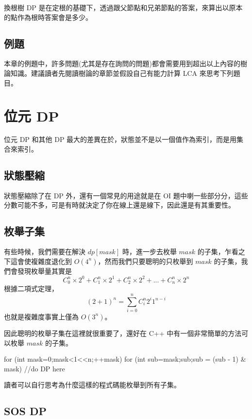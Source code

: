 \documentclass[main.tex]{subfiles}
\begin{document}
        換根樹 DP 是在定根的基礎下，透過跟父節點和兄弟節點的答案，來算出以原本的點作為根時答案會是多少。
    
    \subsection{例題}
        本章的例題中，許多問題(尤其是存在詢問的問題)都會需要用到超出以上內容的樹論知識。建議讀者先閱讀樹論的章節並假設自己有能力計算 LCA 來思考下列題目。


\section{位元 DP}
    位元 DP 和其他 DP 最大的差異在於，狀態並不是以一個值作為索引，而是用集合來索引。
    \subsection{狀態壓縮}
        狀態壓縮除了在 DP 外，還有一個常見的用途就是在 OI 題中喇一些部分分，這些分數可能不多，可是有時就決定了你在線上還是線下，因此還是有其重要性。
    
    \subsection{枚舉子集}
        有些時候，我們需要在解決 $dp[mask]$ 時，進一步去枚舉 $mask$ 的子集，乍看之下這會使複雜度退化到 $O(4^n)$，然而我們只要聰明的只枚舉到 $mask$ 的子集，我們會發現枚舉量其實是
        $$C^n_0 \times 2^0 + C^n_1 \times 2^1 + C^n_2 \times 2^2 + ... + C^n_n \times 2^n$$
        根據二項式定理，
        $$(2+1)^n = \sum_{i=0}^n C^n_i 2^i1^{n-i}$$
        也就是複雜度事實上僅為 $O(3^n)$。
        
        因此聰明的枚舉子集在這裡就很重要了，還好在 C++ 中有一個非常簡單的方法可以枚舉 $mask$ 的子集。
        \begin{C++}
for (int mask=0;mask<1<<n;++mask){
    for (int sub=mask;sub;sub = (sub - 1) & mask){
        //do DP here
    }
}
        \end{C++}
        
        讀者可以自行思考為什麼這樣的程式碼能枚舉到所有子集。
    
    \subsection{SOS DP}
    
\end{document}
